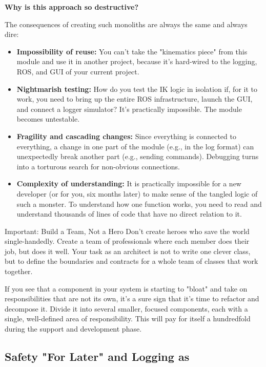 \textbf{Why is this approach so destructive?}

The consequences of creating such monoliths are always the same and always dire:
\begin{itemize}
    \item \textbf{Impossibility of reuse:} You can't take the "kinematics piece" from this module and use it in another project, because it's hard-wired to the logging, ROS, and GUI of your current project.
    \item \textbf{Nightmarish testing:} How do you test the IK logic in isolation if, for it to work, you need to bring up the entire ROS infrastructure, launch the GUI, and connect a logger simulator? It's practically impossible. The module becomes untestable.
    \item \textbf{Fragility and cascading changes:} Since everything is connected to everything, a change in one part of the module (e.g., in the log format) can unexpectedly break another part (e.g., sending commands). Debugging turns into a torturous search for non-obvious connections.
    \item \textbf{Complexity of understanding:} It is practically impossible for a new developer (or for you, six months later) to make sense of the tangled logic of such a monster. To understand how one function works, you need to read and understand thousands of lines of code that have no direct relation to it.
\end{itemize}

\begin{principlebox}{Important: Build a Team, Not a Hero}
Don't create heroes who save the world single-handedly. Create a team of professionals where each member does their job, but does it well. Your task as an architect is not to write one clever class, but to define the boundaries and contracts for a whole team of classes that work together.
\end{principlebox}

If you see that a component in your system is starting to "bloat" and take on responsibilities that are not its own, it's a sure sign that it's time to refactor and decompose it. Divide it into several smaller, focused components, each with a single, well-defined area of responsibility. This will pay for itself a hundredfold during the support and development phase.


\subsection{Safety "For Later" and Logging as }


